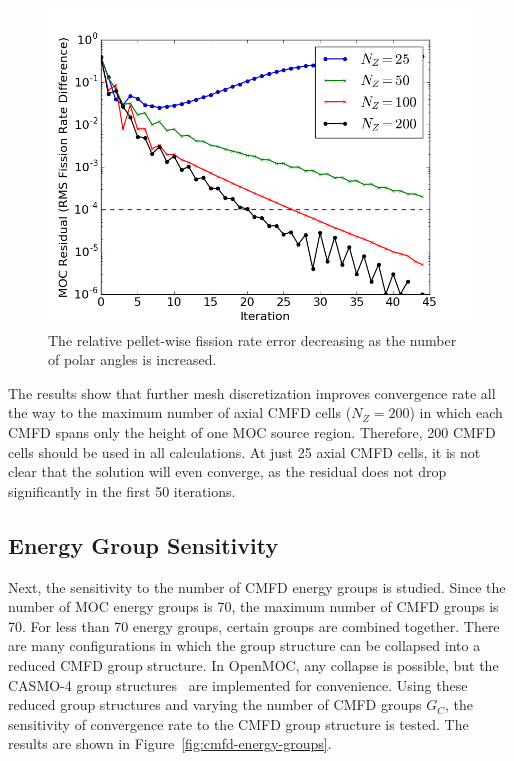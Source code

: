 \begin{figure}[h!]
	\centering
	\includegraphics[width=0.7\linewidth]{figures/results/sensitivity/cmfd-axial-cells.png}
	\caption[]{The relative pellet-wise fission rate error decreasing as the number of polar angles is increased.}
	\label{fig:cmfd-axial-cells}
\end{figure}

The results show that further mesh discretization improves convergence rate all the way to the maximum number of axial \ac{CMFD} cells ($N_Z = 200$) in which each \ac{CMFD} spans only the height of one \ac{MOC} source region. Therefore, 200 \ac{CMFD} cells should be used in all calculations. At just 25 axial \ac{CMFD} cells, it is not clear that the solution will even converge, as the residual does not drop significantly in the first 50 iterations.

\subsection{Energy Group Sensitivity}

Next, the sensitivity to the number of \ac{CMFD} energy groups is studied. Since the number of \ac{MOC} energy groups is 70, the maximum number of \ac{CMFD} groups is 70. For less than 70 energy groups, certain groups are combined together. There are many configurations in which the group structure can be collapsed into a reduced \ac{CMFD} group structure. In OpenMOC, any collapse is possible, but the CASMO-4 group structures~\cite{edenius1995casmo} are implemented for convenience. Using these reduced group structures and varying the number of \ac{CMFD} groups $G_C$, the sensitivity of convergence rate to the \ac{CMFD} group structure is tested. The results are shown in Figure~\ref{fig:cmfd-energy-groups}.


